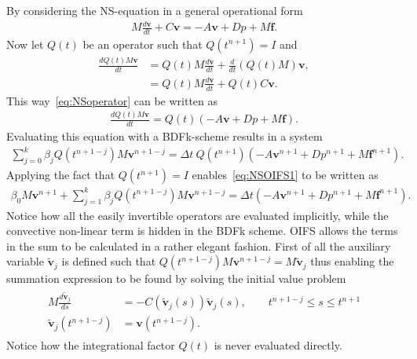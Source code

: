 By considering the NS-equation in a general operational form 
%
\begin{align}
    M\frac{d \mathbf{v}}{dt} + C\mathbf{v} = -A\mathbf{v} +D p +M\mathbf{f}.
    \label{eq:NSoperator}
\end{align}
%
Now let $Q(t)$ be an operator such that $Q(t^{n+1}) = I$ and 
%
\begin{align}
    \frac{dQ(t)M\mathbf{v}}{dt} &=  Q(t)M\frac{d\mathbf{v}}{dt} + \frac{d}{dt}(Q(t)M)\mathbf{v},\\
    &= Q(t)M\frac{d\mathbf{v}}{dt} + Q(t)C\mathbf{v}. 
    \label{eq:integrationalfactor}
\end{align}
%
This way~\ref{eq:NSoperator} can be written as 
\begin{align}
    \frac{d Q(t)M\mathbf{v}}{dt} =Q(t)( -A\mathbf{v} +D p +M\mathbf{f}).
    \label{eq:NSoperatorOIFS}
\end{align}
Evaluating this equation with a BDFk-scheme results in a system 
\begin{align}
    \sum_{j=0}^{k}\beta_jQ(t^{n+1-j})M\mathbf{v}^{n+1-j} =\Delta t \: Q(t^{n+1})( -A\mathbf{v}^{n+1} +D p^{n+1} +M\mathbf{f}^{n+1}).
    \label{eq:NSOIFS1}
\end{align}
Applying the fact that $Q(t^{n+1}) = I$ enables~\ref{eq:NSOIFS1} to be written as 
\begin{align}
    \beta_0M\mathbf{v}^{n+1} + \sum_{j=1}^{k}\beta_jQ(t^{n+1-j})M\mathbf{v}^{n+1-j} 
    =\Delta t ( -A\mathbf{v}^{n+1} +D p^{n+1} +M\mathbf{f}^{n+1}).
    \label{eq:NSOIFS1}
\end{align}
Notice how all the easily invertible operators are evaluated implicitly, while the convective non-linear term is hidden in the BDFk scheme. 
OIFS allows the terms in the sum to be calculated in a rather elegant fashion.
First of all the auxiliary variable $\tilde{\mathbf{v}}_j$ is defined such that $Q(t^{n+1-j})M\mathbf{v}^{n+1-j} = M\tilde{\mathbf{v}}_j$
thus enabling the summation expression to be found by solving the initial value problem 
\begin{align}
    \begin{split}
    M\frac{d\tilde{\mathbf{v}}_j}{ds} &= -C(\tilde{\mathbf{v}}_j(s))\tilde{\mathbf{v}}_j(s) , \qquad t^{n+1-j}\leq s\leq t^{n+1}\\
    \tilde{\mathbf{v}}_j(t^{n+1-j}) &= \mathbf{v}(t^{n+1-j}).
    \end{split}
    \label{eq:IVP}
\end{align}
Notice how the integrational factor $Q(t)$ is never evaluated directly.

